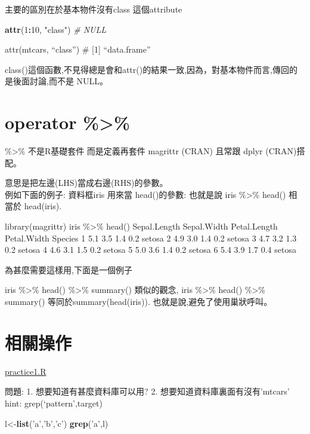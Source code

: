 \documentclass[]{book}
\newenvironment{Shaded}{\begin{snugshade}}{\end{snugshade}}
\newcommand{\KeywordTok}[1]{\textcolor[rgb]{0.13,0.29,0.53}{\textbf{#1}}}
\newcommand{\DecValTok}[1]{\textcolor[rgb]{0.00,0.00,0.81}{#1}}
\newcommand{\StringTok}[1]{\textcolor[rgb]{0.31,0.60,0.02}{#1}}
\newcommand{\CommentTok}[1]{\textcolor[rgb]{0.56,0.35,0.01}{\textit{#1}}}
\newcommand{\OperatorTok}[1]{\textcolor[rgb]{0.81,0.36,0.00}{\textbf{#1}}}
\newcommand{\NormalTok}[1]{#1}
\theoremstyle{definition}
\theoremstyle{definition}
\theoremstyle{definition}
\theoremstyle{remark}
\begin{document}
主要的區別在於基本物件沒有class 這個attribute

\begin{Shaded}
\begin{Highlighting}[]
\KeywordTok{attr}\NormalTok{(}\DecValTok{1}\OperatorTok{:}\DecValTok{10}\NormalTok{, }\StringTok{"class"}\NormalTok{) }\CommentTok{#  NULL}
\end{Highlighting}
\end{Shaded}

attr(mtcars, ``class'') \# {[}1{]} ``data.frame''

class()這個函數,不見得總是會和attr()的結果一致,因為，對基本物件而言,傳回的是後面討論,而不是
NULL。

\section{operator \%\textgreater{}\%}\label{operator}

\%\textgreater{}\% 不是R基礎套件 而是定義再套件 magrittr (CRAN) 且常跟
dplyr (CRAN)搭配。

意思是把左邊(LHS)當成右邊(RHS)的參數。\\
例如下面的例子: 資料框iris 用來當 head()的參數: 也就是說 iris
\%\textgreater{}\% head() 相當於 head(iris).

library(magrittr) iris \%\textgreater{}\% head() Sepal.Length
Sepal.Width Petal.Length Petal.Width Species 1 5.1 3.5 1.4 0.2 setosa 2
4.9 3.0 1.4 0.2 setosa 3 4.7 3.2 1.3 0.2 setosa 4 4.6 3.1 1.5 0.2 setosa
5 5.0 3.6 1.4 0.2 setosa 6 5.4 3.9 1.7 0.4 setosa

為甚麼需要這樣用,下面是一個例子

iris \%\textgreater{}\% head() \%\textgreater{}\% summary() 類似的觀念,
iris \%\textgreater{}\% head() \%\textgreater{}\% summary()
等同於summary(head(iris)). 也就是說,避免了使用巢狀呼叫。

\section{相關操作}

\href{resources/practice1.R}{practice1.R}

問題: 1. 想要知道有甚麼資料庫可以用? 2. 想要知道資料庫裏面有沒有'mtcars'
hint: grep(`pattern',target)

\begin{Shaded}
\begin{Highlighting}[]
\NormalTok{l<-}\KeywordTok{list}\NormalTok{(}\StringTok{'a'}\NormalTok{,}\StringTok{'b'}\NormalTok{,}\StringTok{'c'}\NormalTok{)}
\KeywordTok{grep}\NormalTok{(}\StringTok{'a'}\NormalTok{,l)}
\end{Highlighting}
\end{Shaded}
\end{document}
